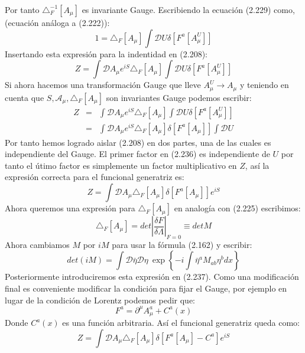 Por tanto $\triangle_{F}^{-1}[A_\mu]$ es invariante Gauge. Escribiendo la ecuación (2.229) como, (ecuación análoga a (2.222)):
\begin{equation}
1=\triangle_{F}[A_{\mu}]\int\mathcal{D}U\delta[F^{a}[A_{\mu}^{U}]]
\end{equation}
Insertando esta expresión para la indentidad en (2.208):
\begin{equation}
Z=\int\mathcal{D}A_{\mu}e^{iS}\triangle_{F}[A_{\mu}]\int\mathcal{D}U\delta[F^{a}[A_{\mu}^{U}]]
\end{equation}
Si ahora hacemos una transformación Gauge que lleve $A_{\mu}^{U} \to A_\mu$ y teniendo en cuenta que $S,\mathcal{A_\mu}, \triangle_{F}[A_{\mu}] $ son invariantes Gauge podemos escribir:
\begin{eqnarray}
\nonumber Z&=&\int\mathcal{D}A_{\mu}e^{iS}\triangle_{F}[A_{\mu}]\int\mathcal{D}U\delta[F^{a}[A_{\mu}^{U}]]\\
&=&\int\mathcal{D}A_{\mu}e^{iS}\triangle_{F}[A_{\mu}]\delta[F^{a}[A_{\mu}]]\int\mathcal{D}U
\end{eqnarray}
Por tanto hemos logrado aislar (2.208) en dos partes, una de las cuales es independiente del Gauge. El primer factor en (2.236) es independiente de $U $ por tanto el útimo factor es simplemente un factor multiplicativo en $Z$, así la expresión correcta para el funcional generatriz es:
\begin{equation}
Z=\int\mathcal{D}A_{\mu}\triangle_{F}[A_{\mu}]\delta[F^{a}[A_{\mu}]]e^{iS}
\end{equation}
Ahora queremos una expresión para $ \triangle_{F}[A_{\mu}]$ en analogía con (2.225) escribimos:
\begin{equation}
\triangle_{F}[A_{\mu}]=det|\frac{\delta F}{\delta\Lambda}|_{F=0}\equiv detM
\end{equation} 
Ahora cambiamos $M$ por $iM$ para usar la fórmula (2.162) y escribir:
\begin{equation}
det(iM)=\int\mathcal{D}\bar{\eta}\mathcal{D}\eta\ \exp\left\{ -i\int\bar{\eta}^{a}M_{ab}\eta^{b}dx\right\} 
\end{equation}
Posteriormente introduciremos esta expresión en (2.237). Como una modificación final es conveniente modificar la condición para fijar el Gauge, por ejemplo en lugar de la condición de Lorentz podemos pedir que:
\begin{equation}
F^a=\partial^\mu A_{\mu}^{a}+C^a(x)
\end{equation} 
Donde $C^a(x)$ es una función arbitraria. Así el funcional generatriz queda como:
\begin{equation}
Z=\int\mathcal{D}A_{\mu}\triangle_{F}[A_{\mu}]\delta[F^{a}[A_{\mu}]-C^a]e^{iS}
\end{equation}
